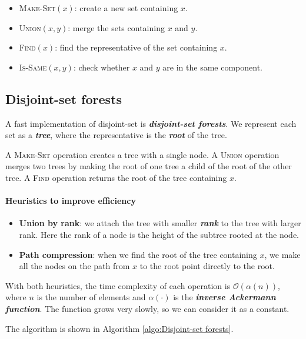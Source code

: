 \documentclass[12pt,a4paper]{ctexart}
\newcommand{\highlight}[1]{\textbf{\textit{#1}}}
\begin{document}
    \begin{itemize}
        \item \textsc{Make-Set}$(x)$: create a new set containing $x$.
        \item \textsc{Union}$(x,y)$: merge the sets containing $x$ and $y$.
        \item \textsc{Find}$(x)$: find the representative of the set containing $x$.
        \item \textsc{Is-Same}$(x,y)$: check whether $x$ and $y$ are in the same component.
    \end{itemize}

    \subsection{Disjoint-set forests}

    A fast implementation of disjoint-set is \highlight{disjoint-set forests}. We represent each set as a \highlight{tree}, where the representative is the \highlight{root} of the tree.

    A \textsc{Make-Set} operation creates a tree with a single node. A \textsc{Union} operation merges two trees by making the root of one tree a child of the root of the other tree. A \textsc{Find} operation returns the root of the tree containing $x$.
    
    \paragraph{Heuristics to improve efficiency}

    \begin{itemize}
        \item {\bf Union by rank}: we attach the tree with smaller \highlight{rank} to the tree with larger rank. Here the rank of a node is the height of the subtree rooted at the node.
        \item {\bf Path compression}: when we find the root of the tree containing $x$, we make all the nodes on the path from $x$ to the root point directly to the root.
    \end{itemize}

    With both heuristics, the time complexity of each operation is $\mathcal O(\alpha(n))$, where $n$ is the number of elements and $\alpha(\cdot)$ is the \highlight{inverse Ackermann function}. The function grows very slowly, so we can consider it as a constant.
    
    The algorithm is shown in Algorithm \ref{algo:Disjoint-set forests}.
\end{document}
